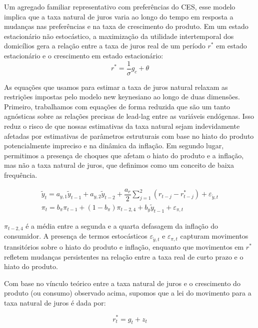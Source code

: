 \documentclass[11pt,oneside,a4paper]{article}
\begin{document}
Um agregado familiar representativo com preferências do CES, esse modelo implica que a taxa natural de juros varia ao longo do tempo em resposta a mudanças nas preferências e na taxa de crescimento do produto. Em um estado estacionário não estocástico, a maximização da utilidade intertemporal dos domicílios gera a relação entre a taxa de juros real de um período $r^{*}$ em estado estacionário e o crescimento em estado estacionário:
\begin{equation}
    r^{*} = \dfrac{1}{\sigma} g_c + \theta
\end{equation}

As equações que usamos para estimar a taxa de juros natural relaxam as restrições impostas pelo modelo new keynesiano ao longo de duas dimensões. Primeiro, trabalhamos com equações de forma reduzida que são um tanto agnósticas sobre as relações precisas de lead-lag entre as variáveis endógenas. Isso reduz o risco de que nossas estimativas da taxa natural sejam indevidamente afetadas por estimativas de parâmetros estruturais com base no hiato do produto potencialmente impreciso e na dinâmica da inflação. Em segundo lugar, permitimos a presença de choques que afetam o hiato do produto e a inflação, mas não a taxa natural de juros, que definimos como um conceito de baixa frequência.

\begin{eqnarray}
    \tilde{y}_t = a_{y,1}\tilde{y}_{t-1} + a_{y,2}\tilde{y}_{t-2} + \dfrac{a_r}{2} \sum_{j=1}^{2} (r_{t-j} - r_{t-j}^{*}) + \varepsilon_{\tilde{y},t} \\
    \pi_t = b_{\pi} \pi_{t-1} + (1 - b_{\pi}) \pi_{t-2,4} + b_y \tilde{y}_{t-1} + \varepsilon_{\pi,t}
\end{eqnarray}

$\pi_{t-2,4} $ é a média entre a segunda e a quarta defasagem da inflação do consumidor. A presença de termos estocásticos $\varepsilon_{\tilde{y},t} $ e $\varepsilon_{\pi,t} $ capturam movimentos transitórios sobre o hiato do produto e inflação, enquanto que movimentos em $r^{*}$ refletem mudanças persistentes na relação entre a taxa real de curto prazo e o hiato do produto.

Com base no vínculo teórico entre a taxa natural de juros e o crescimento do produto (ou consumo) observado acima, supomos que a lei do movimento para a taxa natural de juros é dada por:

\begin{equation}
    r_t^{*} = g_t + z_t
\end{equation}
\end{document}
